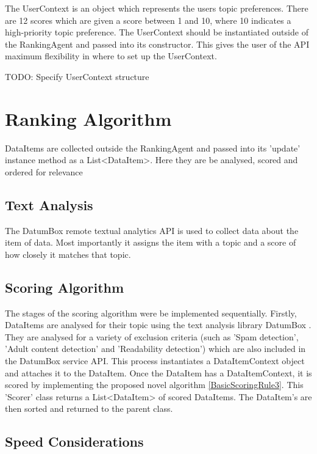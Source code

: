 The UserContext is an object which represents the users topic preferences. There are 12 scores which are given a score between 1 and 10, where 10 indicates a high-priority topic preference. The UserContext should be instantiated outside of the RankingAgent and passed into its constructor. This gives the user of the API maximum flexibility in where to set up the UserContext. 

TODO: Specify UserContext structure

\section{Ranking Algorithm}

DataItems are collected outside the RankingAgent and passed into its 'update' instance method as a List<DataItem>. Here they are be analysed, scored and ordered for relevance

\subsection{Text Analysis}

The DatumBox \cite{DatumBox} remote textual analytics API is used to collect data about the item of data. Most importantly it assigns the item with a topic and a score of how closely it matches that topic. 

\subsection{Scoring Algorithm}

The stages of the scoring algorithm were be implemented sequentially. Firstly, DataItems are analysed for their topic using the text analysis library DatumBox \cite{DatumBox}. They are analysed for a variety of exclusion criteria (such as 'Spam detection', 'Adult content detection' and 'Readability detection') which are also included in the DatumBox service API. This process instantiates a DataItemContext object and attaches it to the DataItem.
Once the DataItem has a DataItemContext, it is scored by implementing the proposed novel algorithm \ref{BasicScoringRule3}. This 'Scorer' class returns a List<DataItem> of scored DataItems. The DataItem's are then sorted and returned to the parent class.

\subsection{Speed Considerations}

